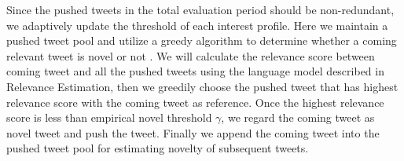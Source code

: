 Since the pushed tweets in the total evaluation period should be non-redundant,
we adaptively update the threshold of each interest profile.
Here we maintain a pushed tweet pool and utilize a greedy algorithm to determine whether a coming relevant tweet is novel or not \cite{fei2015handling,albakour2013sparsity}. We will calculate the relevance score between coming tweet and all the pushed tweets using the language model described in Relevance Estimation, then we greedily choose the pushed tweet that has highest relevance score with the coming tweet as reference. Once the highest relevance score is less than empirical novel threshold $\gamma$, we regard the coming tweet as novel tweet and push the tweet. Finally we append the coming tweet into the pushed tweet pool for estimating novelty of subsequent tweets.
